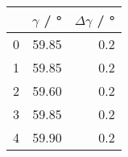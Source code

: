 \begin{tabular}{lrr}
\toprule
{} &  $\gamma$ / \si{\degree} &  $\Delta \gamma$ / \si{\degree} \\
\midrule
0 &                    59.85 &                             0.2 \\
1 &                    59.85 &                             0.2 \\
2 &                    59.60 &                             0.2 \\
3 &                    59.85 &                             0.2 \\
4 &                    59.90 &                             0.2 \\
\bottomrule
\end{tabular}
